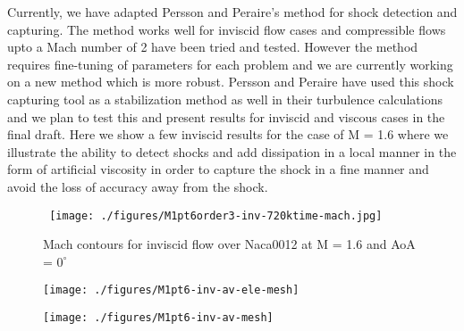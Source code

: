 Currently, we have adapted Persson and Peraire's method \cite{Persson06} for shock detection and capturing. The method works well for inviscid flow cases and compressible flows upto a Mach number of 2 have been tried and tested. However the method requires fine-tuning of parameters for each problem and we are currently working on a new method which is more robust. Persson and Peraire have used this shock capturing tool as a stabilization method as well in their turbulence calculations and we plan to test this and present results for inviscid and viscous cases in the final draft. Here we show a few inviscid results for the case of M = 1.6 where we illustrate the ability to detect shocks and add dissipation in a local manner in the form of artificial viscosity in order to capture the shock in a fine manner and avoid the loss of accuracy away from the shock.    

\begin{figure}[h] \tt
\centering
\texttt{[image: ./figures/M1pt6order3-inv-720ktime-mach.jpg]} \\
\caption{Mach contours for inviscid flow over Naca0012 at M = 1.6 and AoA = $0^{\circ} $}
\label{fig:inv_mach}
\end{figure}

\begin{figure}
\centering
\begin{minipage}[t]{.5\textwidth}
  \centering
  \texttt{[image: ./figures/M1pt6-inv-av-ele-mesh]}
  \label{fig:AV-ele}
\end{minipage}%
\begin{minipage}[t]{.5\textwidth}
  \centering
  \texttt{[image: ./figures/M1pt6-inv-av-mesh]}
  \label{fig:AV-cont}
\end{minipage}
\end{figure} 

